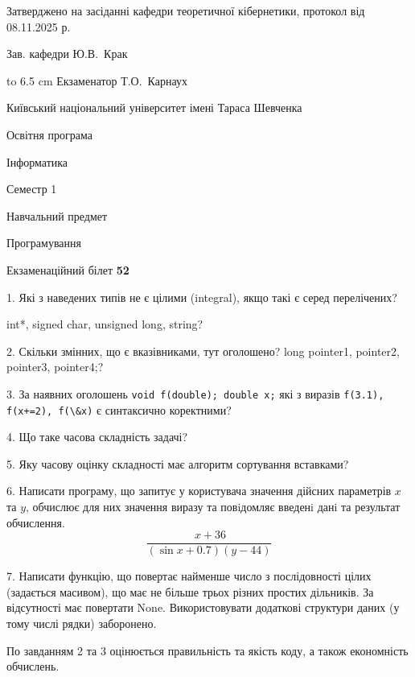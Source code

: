 \documentclass[12pt, ukrainian]{article}
\def\code#1{\Verb!#1!}
\begin{document}
{\smallskip\smallskip \begin {scriptsize} Затверджено на засіданні кафедри теоретичної кібернетики, протокол   від   08.11.2025 р.\par\smallskip\smallskip\smallskip\smallskip
{\parbox {6.5 cm} {Зав. кафедри \dotfill Ю.В.~Крак}}\hspace {0.7cm} {\hbox to 6.5 cm { Екзаменатор \dotfill Т.О.~Карнаух}} \end{scriptsize}}
\vspace{0.9cm}
{{\begin {scriptsize}\par
{ \center  Київський національний університет імені Тараса Шевченка \par}
{\parbox {5 cm}{Освітня програма \hfill}{\parbox {7 cm}{Інформатика\hfill}}\parbox {6 cm}{\hfill Семестр 1}}\par
{\parbox {5 cm} {Навчальний предмет \hfill}\parbox {7 cm}{Програмування \hfill}\parbox {6cm}{\hfill}\par}\vspace{-15pt} \end{scriptsize}}{\center Екзаменаційний білет \No \textbf { 52 }\par}}
{%
1. Які з наведених типів не є цілими (integral), якщо такі є серед перелічених?

int*, signed char, unsigned long, string?
\par
\vspace{2mm}
2. Скільки змінних, що є вказівниками, тут оголошено?
long pointer1, pointer2, pointer3, pointer4;?
\par
\vspace{2mm}
3. За наявних оголошень \code{void f(double); double x;} які з виразів \code{f(3.1), f(x+=2), f(\&x)} є синтаксично коректними?
\par
\vspace{2mm}
4. Що таке часова складність задачі?
\par
\vspace{2mm}
5. Яку часову оцінку складності має алгоритм сортування вставками?
\par
\vspace{2mm}
6. Написати програму, що запитує у користувача значення дійсних параметрів $x$ та $y$, обчислює для них значення виразу та повiдомляє введенi данi та результат обчислення.
$$\frac{\ x + 36}{(\sin x + 0.7) (y - 44)}$$ 

\par
7. Написати функцію, що повертає найменше число з послідовності цілих (задається масивом), що має не більше трьох різних простих дільників. За відсутності має повертати None. Використовувати додаткові структури даних (у тому числі рядки) заборонено.

По завданням 2 та 3 оцінюється правильність та якість коду, а також економність обчислень.

}
\end{document}
